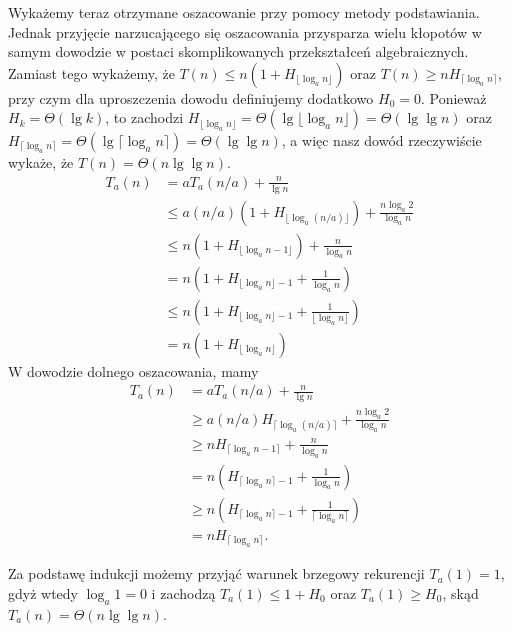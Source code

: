 Wykażemy teraz otrzymane oszacowanie przy pomocy metody podstawiania. Jednak przyjęcie narzucającego się oszacowania przysparza wielu kłopotów w samym dowodzie w postaci skomplikowanych przekształceń algebraicznych. Zamiast tego wykażemy, że $T(n)\le n(1+H_{\lfloor\log_an\rfloor})$ oraz $T(n)\ge nH_{\lceil\log_an\rceil}$, przy czym dla uproszczenia dowodu definiujemy dodatkowo $H_0=0$. Ponieważ $H_k=\Theta(\lg k)$, to zachodzi $H_{\lfloor\log_an\rfloor}=\Theta(\lg\lfloor\log_an\rfloor)=\Theta(\lg\lg n)$ oraz $H_{\lceil\log_an\rceil}=\Theta(\lg\lceil\log_an\rceil)=\Theta(\lg\lg n)$, a więc nasz dowód rzeczywiście wykaże, że $T(n)=\Theta(n\lg\lg n)$.
\begin{align*}
	T_a(n) &= aT_a(n/a)+\frac{n}{\lg n} \\
	&\le a(n/a)(1+H_{\lfloor\log_a(n/a)\rfloor})+\frac{n\log_a2}{\log_an} \\
	&\le n(1+H_{\lfloor\log_an-1\rfloor})+\frac{n}{\log_an} \\
	&= n\left(1+H_{\lfloor\log_an\rfloor-1}+\frac{1}{\log_an}\right) \\
	&\le n\left(1+H_{\lfloor\log_an\rfloor-1}+\frac{1}{\lfloor\log_an\rfloor}\right) \\
	&= n(1+H_{\lfloor\log_an\rfloor})
\end{align*}
W dowodzie dolnego oszacowania, mamy
\begin{align*}
	T_a(n) &= aT_a(n/a)+\frac{n}{\lg n} \\
	&\ge a(n/a)H_{\lceil\log_a(n/a)\rceil}+\frac{n\log_a2}{\log_an} \\
	&\ge nH_{\lceil\log_an-1\rceil}+\frac{n}{\log_an} \\
	&= n\left(H_{\lceil\log_an\rceil-1}+\frac{1}{\log_an}\right) \\
	&\ge n\left(H_{\lceil\log_an\rceil-1}+\frac{1}{\lceil\log_an\rceil}\right) \\
	&= nH_{\lceil\log_an\rceil}.
\end{align*}

Za podstawę indukcji możemy przyjąć warunek brzegowy rekurencji $T_a(1)=1$, gdyż wtedy $\log_a1=0$ i zachodzą $T_a(1)\le 1+H_0$ oraz $T_a(1)\ge H_0$, skąd $T_a(n)=\Theta(n\lg\lg n)$.

